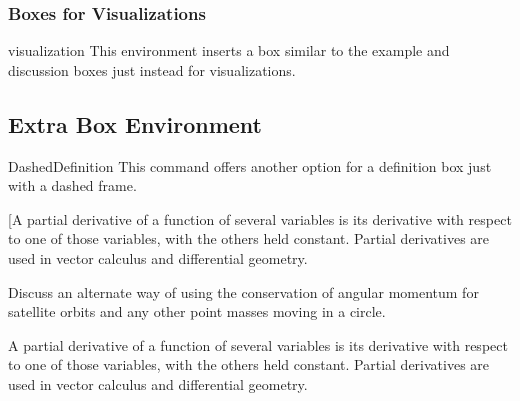 		\subsubsection{Boxes for Visualizations}
			\begin{docEnvironment}{visualization}{}
				This environment inserts a box similar to the example and discussion boxes just instead for visualizations. 
			\end{docEnvironment}
	\subsection{Extra Box Environment}
		\begin{docEnvironment}{DashedDefinition}{}
			This command offers another option for a definition box just with a dashed frame.
		\end{docEnvironment}
\vspace{2mm}		
\begin{disexam}
\begin{DashedDefinition}{}
[A partial derivative of a function of several variables is its derivative with respect to one of those variables, with the others held constant. Partial derivatives are used in vector calculus and differential geometry.
\end{DashedDefinition}
\end{disexam}
\vspace*{0.75\baselineskip}
\begin{disexam}
\vspace{1mm}
\begin{visualization}
Discuss an alternate way of using the conservation of angular momentum for satellite orbits and any other point masses moving in a circle.
\tcbline
\end{visualization}
\vspace{1mm}
\end{disexam}
\vspace*{0.75\baselineskip}
\begin{disexam}
\begin{example2}
\vspace{1mm}
A partial derivative of a function of several variables is its derivative with respect to one of those variables, with the others held constant. Partial derivatives are used in vector calculus and differential geometry.
\tcbline
\end{example2}
\end{disexam}
